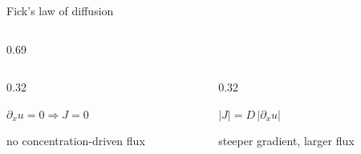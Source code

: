 \begin{frame}{Fick's law of diffusion}
\begin{columns}[c,onlytextwidth]
\begin{column}{0.69\textwidth}
\begin{columns}[T,totalwidth=\linewidth]
        \begin{column}{0.32\linewidth}
          \centering
          {\color{HydraWhite}\fontsize{8.1}{9.7}\selectfont
            $\partial_xu=0\Rightarrow J=0$
          \par}
          {\color{HydraMuted}\fontsize{6.8}{8.2}\selectfont
            no concentration-driven flux
          \par}
        \end{column}

        \begin{column}{0.32\linewidth}
          \centering
          {\color{HydraWhite}\fontsize{8.1}{9.7}\selectfont
            $|J|=D\,|\partial_xu|$
          \par}
          {\color{HydraMuted}\fontsize{6.8}{8.2}\selectfont
            steeper gradient, larger flux
          \par}
        \end{column}
      \end{columns}

    \end{column}

  \end{columns}


\end{frame}


